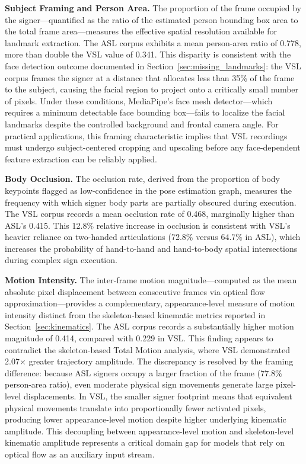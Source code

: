 \documentclass{ieeeaccess}
\begin{document}
\textbf{Subject Framing and Person Area.} The proportion of the frame occupied by the signer—quantified as the ratio of the estimated person bounding box area to the total frame area—measures the effective spatial resolution available for landmark extraction. The ASL corpus exhibits a mean person-area ratio of 0.778, more than double the VSL value of 0.341. This disparity is consistent with the face detection outcome documented in Section~\ref{sec:missing_landmarks}: the VSL corpus frames the signer at a distance that allocates less than 35\% of the frame to the subject, causing the facial region to project onto a critically small number of pixels. Under these conditions, MediaPipe's face mesh detector—which requires a minimum detectable face bounding box—fails to localize the facial landmarks despite the controlled background and frontal camera angle. For practical applications, this framing characteristic implies that VSL recordings must undergo subject-centered cropping and upscaling before any face-dependent feature extraction can be reliably applied.

\textbf{Body Occlusion.} The occlusion rate, derived from the proportion of body keypoints flagged as low-confidence in the pose estimation graph, measures the frequency with which signer body parts are partially obscured during execution. The VSL corpus records a mean occlusion rate of 0.468, marginally higher than ASL's 0.415. This 12.8\% relative increase in occlusion is consistent with VSL's heavier reliance on two-handed articulations (72.8\% versus 64.7\% in ASL), which increases the probability of hand-to-hand and hand-to-body spatial intersections during complex sign execution.

\textbf{Motion Intensity.} The inter-frame motion magnitude—computed as the mean absolute pixel displacement between consecutive frames via optical flow approximation—provides a complementary, appearance-level measure of motion intensity distinct from the skeleton-based kinematic metrics reported in Section~\ref{sec:kinematics}. The ASL corpus records a substantially higher motion magnitude of 0.414, compared with 0.229 in VSL. This finding appears to contradict the skeleton-based Total Motion analysis, where VSL demonstrated 2.07$\times$ greater trajectory amplitude. The discrepancy is resolved by the framing difference: because ASL signers occupy a larger fraction of the frame ($77.8\%$ person-area ratio), even moderate physical sign movements generate large pixel-level displacements. In VSL, the smaller signer footprint means that equivalent physical movements translate into proportionally fewer activated pixels, producing lower appearance-level motion despite higher underlying kinematic amplitude. This decoupling between appearance-level motion and skeleton-level kinematic amplitude represents a critical domain gap for models that rely on optical flow as an auxiliary input stream.
\end{document}
